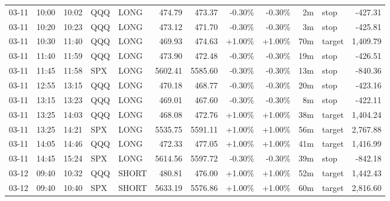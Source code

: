 \documentclass[11pt,a4paper,twoside]{article}
\begin{document}
\begin{center}
\begin{longtable}{>{\color{txtmain}}l l l l l r r r r r >{\color{txtmain}}l r}
03-11 & 10:00 & 10:02 & QQQ & LONG & 474.79 & 473.37 & \textcolor{lossred}{-0.30\%} & \textcolor{lossred}{-0.30\%} & 2m & stop & \textcolor{lossred}{-427.31} \\
03-11 & 10:20 & 10:23 & QQQ & LONG & 473.12 & 471.70 & \textcolor{lossred}{-0.30\%} & \textcolor{lossred}{-0.30\%} & 3m & stop & \textcolor{lossred}{-425.81} \\
03-11 & 10:30 & 11:40 & QQQ & LONG & 469.93 & 474.63 & \textcolor{wingreen}{+1.00\%} & \textcolor{wingreen}{+1.00\%} & 70m & target & \textcolor{wingreen}{1,409.79} \\
03-11 & 11:40 & 11:59 & QQQ & LONG & 473.90 & 472.48 & \textcolor{lossred}{-0.30\%} & \textcolor{lossred}{-0.30\%} & 19m & stop & \textcolor{lossred}{-426.51} \\
03-11 & 11:45 & 11:58 & SPX & LONG & 5602.41 & 5585.60 & \textcolor{lossred}{-0.30\%} & \textcolor{lossred}{-0.30\%} & 13m & stop & \textcolor{lossred}{-840.36} \\
03-11 & 12:55 & 13:15 & QQQ & LONG & 470.18 & 468.77 & \textcolor{lossred}{-0.30\%} & \textcolor{lossred}{-0.30\%} & 20m & stop & \textcolor{lossred}{-423.16} \\
03-11 & 13:15 & 13:23 & QQQ & LONG & 469.01 & 467.60 & \textcolor{lossred}{-0.30\%} & \textcolor{lossred}{-0.30\%} & 8m & stop & \textcolor{lossred}{-422.11} \\
03-11 & 13:25 & 14:03 & QQQ & LONG & 468.08 & 472.76 & \textcolor{wingreen}{+1.00\%} & \textcolor{wingreen}{+1.00\%} & 38m & target & \textcolor{wingreen}{1,404.24} \\
03-11 & 13:25 & 14:21 & SPX & LONG & 5535.75 & 5591.11 & \textcolor{wingreen}{+1.00\%} & \textcolor{wingreen}{+1.00\%} & 56m & target & \textcolor{wingreen}{2,767.88} \\
03-11 & 14:05 & 14:46 & QQQ & LONG & 472.33 & 477.05 & \textcolor{wingreen}{+1.00\%} & \textcolor{wingreen}{+1.00\%} & 41m & target & \textcolor{wingreen}{1,416.99} \\
03-11 & 14:45 & 15:24 & SPX & LONG & 5614.56 & 5597.72 & \textcolor{lossred}{-0.30\%} & \textcolor{lossred}{-0.30\%} & 39m & stop & \textcolor{lossred}{-842.18} \\
03-12 & 09:40 & 10:32 & QQQ & SHORT & 480.81 & 476.00 & \textcolor{wingreen}{+1.00\%} & \textcolor{wingreen}{+1.00\%} & 52m & target & \textcolor{wingreen}{1,442.43} \\
03-12 & 09:40 & 10:40 & SPX & SHORT & 5633.19 & 5576.86 & \textcolor{wingreen}{+1.00\%} & \textcolor{wingreen}{+1.00\%} & 60m & target & \textcolor{wingreen}{2,816.60} \\

\end{longtable}
\end{center}
\end{document}
